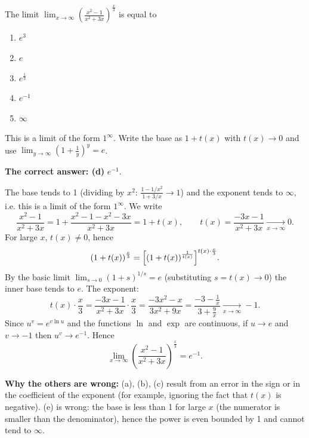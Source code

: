 
\begin{question}
The limit $\displaystyle\lim_{x\to\infty}\left(\frac{x^2-1}{x^2+3x}\right)^{\frac{x}{3}}$ is equal to
\begin{enumerate}
  \item $e^3$
  \item $e$
  \item $e^{\frac13}$
  \item $e^{-1}$
  \item $\infty$
\end{enumerate}
\end{question}

\begin{hint}
This is a limit of the form $1^\infty$. Write the base as $1+t(x)$ with $t(x)\to 0$ and use $\lim_{y\to\infty}\left(1+\frac1y\right)^y=e$.
\end{hint}

\begin{solution}
\textbf{The correct answer: (d)} $e^{-1}$.

The base tends to 1 (dividing by $x^2$: $\frac{1-1/x^2}{1+3/x}\to 1$) and the exponent tends to $\infty$, i.e. this is a limit of the form $1^\infty$. We write
\[
\frac{x^2-1}{x^2+3x}=1+\frac{x^2-1-x^2-3x}{x^2+3x}=1+t(x),\qquad t(x)=\frac{-3x-1}{x^2+3x}\xrightarrow[x\to\infty]{}0 .
\]
For large $x$, $t(x)\neq 0$, hence
\[
\left(1+t(x)\right)^{\frac x3}=\Bigl[\left(1+t(x)\right)^{\frac{1}{t(x)}}\Bigr]^{t(x)\cdot\frac{x}{3}} .
\]
By the basic limit $\lim_{s\to 0}(1+s)^{1/s}=e$ (substituting $s=t(x)\to 0$) the inner base tends to $e$. The exponent:
\[
t(x)\cdot\frac x3=\frac{-3x-1}{x^2+3x}\cdot\frac{x}{3}=\frac{-3x^2-x}{3x^2+9x}=\frac{-3-\frac1x}{3+\frac9x}\xrightarrow[x\to\infty]{}-1 .
\]
Since $u^v=e^{v\ln u}$ and the functions $\ln$ and $\exp$ are continuous, if $u\to e$ and $v\to -1$ then $u^v\to e^{-1}$. Hence
\[
\lim_{x\to\infty}\left(\frac{x^2-1}{x^2+3x}\right)^{\frac{x}{3}}=\boxed{e^{-1}} .
\]

\textbf{Why the others are wrong:} (a), (b), (c) result from an error in the sign or in the coefficient of the exponent (for example, ignoring the fact that $t(x)$ is negative). (e) is wrong: the base is less than 1 for large $x$ (the numerator is smaller than the denominator), hence the power is even bounded by 1 and cannot tend to $\infty$.
\end{solution}

